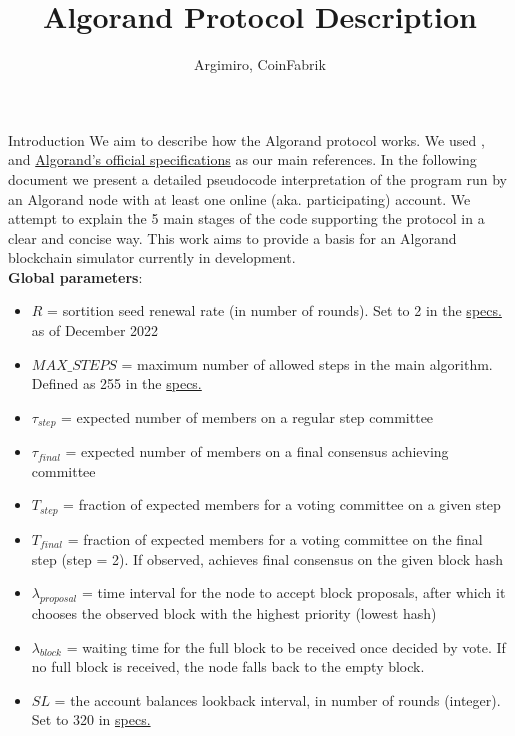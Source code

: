 \documentclass[10pt,a4paper]{article}
\author{Argimiro, CoinFabrik}
\title{Algorand Protocol Description}
\begin{document}
\maketitle
\tableofcontents

\begin{section}{Introduction}
We aim to describe how the Algorand protocol works. We used \cite{DBLP:conf/sosp/GiladHMVZ17},
\cite{DBLP:journals/corr/Micali16} and \href{https://github.com/algorandfoundation/specs}{Algorand's official specifications}
as our main references.
In the following document we present a detailed pseudocode interpretation 
of the program run by an Algorand node with at least one online (aka. 
participating) account. 
We attempt to explain the 5 main stages of the code supporting 
the protocol in a clear and concise way.
This work aims to provide a basis for an Algorand blockchain simulator 
currently in development. \\

\noindent \textbf{Global parameters}:
\begin{itemize}
    \item $R$ = sortition seed renewal rate (in number of rounds). Set to 2 in the \href{https://github.com/algorandfoundation/specs}{specs.}
    as of December 2022
    \item $MAX\_STEPS$ = maximum number of allowed steps in the main algorithm. Defined 
    as 255 in the \href{https://github.com/algorandfoundation/specs}{specs.}
    \item $\tau_{step}$ = expected number of members on a regular step committee
    \item $\tau_{final}$ = expected number of members on a final consensus achieving committee
    \item $T_{step}$ = fraction of expected members for a voting committee on a given step
    \item $T_{final}$ = fraction of expected members for a voting committee on the final step (step = 2). If observed,
    achieves final consensus on the given block hash
    \item $\lambda_{proposal}$ = time interval for the node to accept block proposals, after
    which it chooses the observed block with the highest priority (lowest hash) 
    \item $\lambda_{block}$ = waiting time for the full block to be received once decided by vote.
    If no full block is received, the node falls back to the empty block.
    \item $SL$ = the account balances lookback interval, in number of rounds (integer). Set to 320 in \href{https://github.com/algorandfoundation/specs}{specs.}
  \end{itemize}


\end{section}
\end{document}
